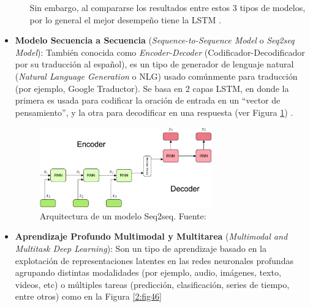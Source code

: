 \begin{itemize}
\begin{itemize}
		Sin embargo, al compararse los resultados entre estos 3 tipos de modelos, por lo general el mejor desempeño tiene la LSTM \parencite{bk_brownlee2017deeplearning_nlp}.
	\end{itemize}
	
	\item \textbf{Modelo Secuencia a Secuencia} (\textit{Sequence-to-Sequence Model} o \textit{Seq2seq Model}): También conocida como \textit{Encoder-Decoder} (Codificador-Decodificador por su traducción al español), es un tipo de generador de lenguaje natural (\textit{Natural Language Generation} o NLG) usado comúnmente para traducción (por ejemplo, Google Traductor). Se basa en 2 capas LSTM, en donde la primera es usada para codificar la oración de entrada en un “vector de pensamiento”, y la otra para decodificar en una respuesta (ver Figura \ref{2:fig45}) \parencite{bk_deng2018deeplearningnlp}.
	
	\begin{figure}[!ht]
		\begin{center}
			\includegraphics[width=0.7\textwidth]{2/figures/encoder-decoder.jpeg}
			\caption{Arquitectura de un modelo Seq2seq. Fuente: \cite{tec_kostadinov2019seq2seq}}
			\label{2:fig45}
		\end{center}
	\end{figure}
	
	\item \textbf{Aprendizaje Profundo Multimodal y Multitarea} (\textit{Multimodal and Multitask Deep Learning}): Son un tipo de aprendizaje basado en la explotación de representaciones latentes en las redes neuronales profundas agrupando distintas modalidades (por ejemplo, audio, imágenes, texto, videos, etc) o múltiples tareas (predicción, clasificación, series de tiempo, entre otros) como en la Figura \ref{2:fig46} \parencite{bk_deng2018deeplearningnlp}
	

\end{itemize}
